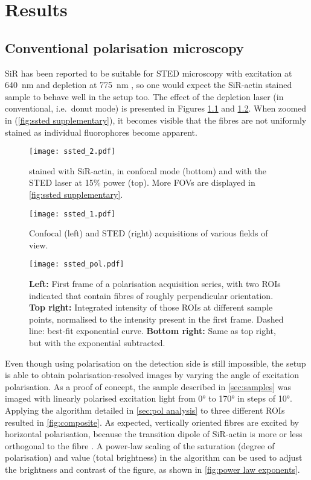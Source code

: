 \chapter{Results}

\section{Conventional polarisation microscopy}
\label{sec:conventional pol}

SiR has been reported to be suitable for STED microscopy with excitation at 640~nm and depletion at 775~nm \cite{DEste2015}, so one would expect the SiR-actin stained sample to behave well in the setup too. The effect of the depletion laser (in conventional, i.e.~donut mode) is presented in Figures \ref{fig:ssted} and \ref{fig:ssted supplementary}. When zoomed in (\autoref{fig:ssted supplementary}), it becomes visible that the fibres are not uniformly stained as individual fluorophores become apparent.

\begin{figure}
	\centering
	\texttt{[image: ssted\_2.pdf]}
	\caption{
	 stained with SiR-actin, in confocal mode (bottom) and with the STED laser at 15\% power (top). More FOVs are displayed in \autoref{fig:ssted supplementary}.
	}
	\label{fig:ssted}
\end{figure}



\begin{figure}
	\centering
	\texttt{[image: ssted\_1.pdf]}
	\caption{
		Confocal (left) and STED (right) acquisitions of various fields of view.
	}
	\label{fig:ssted supplementary}
\end{figure}


\begin{figure}
	\centering
	\texttt{[image: ssted\_pol.pdf]}
	\caption{
		\textbf{Left:} First frame of a polarisation acquisition series, with two ROIs indicated that contain fibres of roughly perpendicular orientation. \textbf{Top right:} Integrated intensity of those ROIs at different sample points, normalised to the intensity present in the first frame. Dashed line: best-fit exponential curve. \textbf{Bottom right:} Same as top right, but with the exponential subtracted.
	}
	\label{fig:ssted pol}
\end{figure}

Even though using polarisation on the detection side is still impossible, the setup is able to obtain polarisation-resolved images by varying the angle of excitation polarisation. As a proof of concept, the sample described in \autoref{sec:samples} was imaged with linearly polarised excitation light from \ang{0} to \ang{170} in steps of \ang{10}. Applying the algorithm detailed in \autoref{sec:pol analysis} to three different ROIs resulted in \autoref{fig:composite}. As expected, vertically oriented fibres are excited by horizontal polarisation, because the transition dipole of SiR-actin is more or less orthogonal to the fibre \cite{Spira2017}.
A power-law scaling of the saturation (degree of polarisation) and value (total brightness) in the algorithm can be used to adjust the brightness and contrast of the figure, as shown in \autoref{fig:power law exponents}.

